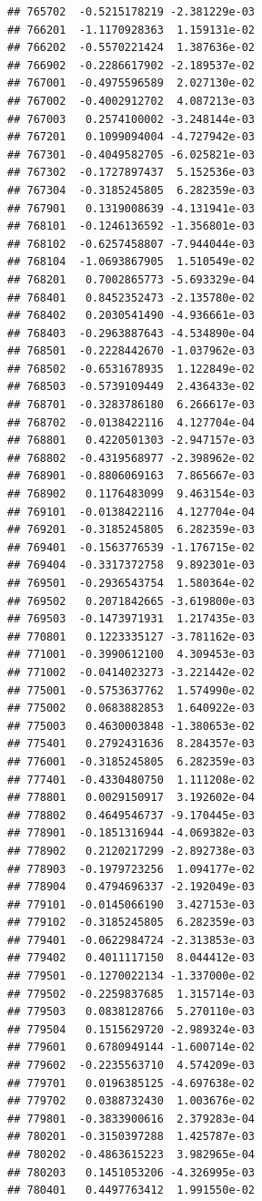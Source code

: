 \begin{frame}[fragile]
\begin{verbatim}
## 765702  -0.5215178219 -2.381229e-03
## 766201  -1.1170928363  1.159131e-02
## 766202  -0.5570221424  1.387636e-02
## 766902  -0.2286617902 -2.189537e-02
## 767001  -0.4975596589  2.027130e-02
## 767002  -0.4002912702  4.087213e-03
## 767003   0.2574100002 -3.248144e-03
## 767201   0.1099094004 -4.727942e-03
## 767301  -0.4049582705 -6.025821e-03
## 767302  -0.1727897437  5.152536e-03
## 767304  -0.3185245805  6.282359e-03
## 767901   0.1319008639 -4.131941e-03
## 768101  -0.1246136592 -1.356801e-03
## 768102  -0.6257458807 -7.944044e-03
## 768104  -1.0693867905  1.510549e-02
## 768201   0.7002865773 -5.693329e-04
## 768401   0.8452352473 -2.135780e-02
## 768402   0.2030541490 -4.936661e-03
## 768403  -0.2963887643 -4.534890e-04
## 768501  -0.2228442670 -1.037962e-03
## 768502  -0.6531678935  1.122849e-02
## 768503  -0.5739109449  2.436433e-02
## 768701  -0.3283786180  6.266617e-03
## 768702  -0.0138422116  4.127704e-04
## 768801   0.4220501303 -2.947157e-03
## 768802  -0.4319568977 -2.398962e-02
## 768901  -0.8806069163  7.865667e-03
## 768902   0.1176483099  9.463154e-03
## 769101  -0.0138422116  4.127704e-04
## 769201  -0.3185245805  6.282359e-03
## 769401  -0.1563776539 -1.176715e-02
## 769404  -0.3317372758  9.892301e-03
## 769501  -0.2936543754  1.580364e-02
## 769502   0.2071842665 -3.619800e-03
## 769503  -0.1473971931  1.217435e-03
## 770801   0.1223335127 -3.781162e-03
## 771001  -0.3990612100  4.309453e-03
## 771002  -0.0414023273 -3.221442e-02
## 775001  -0.5753637762  1.574990e-02
## 775002   0.0683882853  1.640922e-03
## 775003   0.4630003848 -1.380653e-02
## 775401   0.2792431636  8.284357e-03
## 776001  -0.3185245805  6.282359e-03
## 777401  -0.4330480750  1.111208e-02
## 778801   0.0029150917  3.192602e-04
## 778802   0.4649546737 -9.170445e-03
## 778901  -0.1851316944 -4.069382e-03
## 778902   0.2120217299 -2.892738e-03
## 778903  -0.1979723256  1.094177e-02
## 778904   0.4794696337 -2.192049e-03
## 779101  -0.0145066190  3.427153e-03
## 779102  -0.3185245805  6.282359e-03
## 779401  -0.0622984724 -2.313853e-03
## 779402   0.4011117150  8.044412e-03
## 779501  -0.1270022134 -1.337000e-02
## 779502  -0.2259837685  1.315714e-03
## 779503   0.0838128766  5.270110e-03
## 779504   0.1515629720 -2.989324e-03
## 779601   0.6780949144 -1.600714e-02
## 779602  -0.2235563710  4.574209e-03
## 779701   0.0196385125 -4.697638e-02
## 779702   0.0388732430  1.003676e-02
## 779801  -0.3833900616  2.379283e-04
## 780201  -0.3150397288  1.425787e-03
## 780202  -0.4863615223  3.982965e-04
## 780203   0.1451053206 -4.326995e-03
## 780401   0.4497763412  1.991550e-02

\end{verbatim}
\end{frame}
